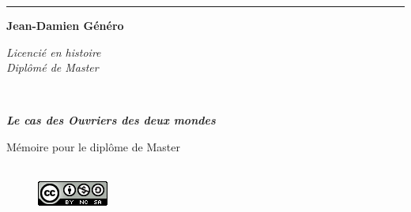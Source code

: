 \begin{titlepage}
\begin{center}

\bigskip

\begin{large}
\end{large}
\begin{center}\rule{2cm}{0.02cm}\end{center}

\bigskip
\bigskip
\bigskip
\begin{Large}
\textbf{Jean-Damien Généro}\\
\end{Large}
\begin{normalsize} \textit{Licencié en histoire}\\
\textit{Diplômé de Master}\\
\end{normalsize}

\bigskip
\bigskip
\bigskip

\begin{Huge}
\textbf{}\\
\end{Huge}
\bigskip
\bigskip
\begin{LARGE}
\textbf{\emph{Le cas des Ouvriers des deux mondes} }\\
\end{LARGE}

\bigskip
\bigskip
\bigskip
\begin{large}
\end{large}
\vfill

\begin{large}
Mémoire 
pour le diplôme de Master \\
\tnah \\
\end{large}
\begin{figure}[h]
    \centering
    \includegraphics{img/cc-icon.png}
    \label{fig:my_label}
\end{figure}

\end{center}
\end{titlepage}